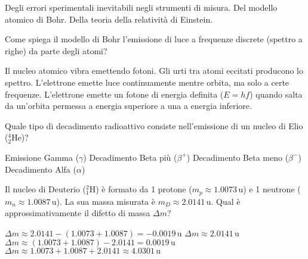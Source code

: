 \documentclass{exam}%
\begin{document}
\begin{questions}
\begin{choices}
\choice Degli errori sperimentali inevitabili negli strumenti di misura.%
\choice Del modello atomico di Bohr.%
\choice Della teoria della relatività di Einstein.%
\end{choices}%
\question Come spiega il modello di Bohr l'emissione di luce a frequenze discrete (spettro a righe) da parte degli atomi?%
\vspace{0.2em}%
\begin{choices}%
\choice Il nucleo atomico vibra emettendo fotoni.%
\choice Gli urti tra atomi eccitati producono lo spettro.%
\choice L'elettrone emette luce continuamente mentre orbita, ma solo a certe frequenze.%
\choice L'elettrone emette un fotone di energia definita ($E = hf$) quando salta da un'orbita permessa a energia superiore a una a energia inferiore.%
\end{choices}%
\question Quale tipo di decadimento radioattivo consiste nell'emissione di un nucleo di Elio ($^4_2\text{He}$)?%
\vspace{0.2em}%
\begin{multicols}{2}%
\begin{choices}%
\choice Emissione Gamma ($\gamma$)%
\choice Decadimento Beta più ($\beta^+$)%
\choice Decadimento Beta meno ($\beta^-$)%
\choice Decadimento Alfa ($\alpha$)%
\end{choices}%
\end{multicols}%
\question Il nucleo di Deuterio ($^2_1\text{H}$) è formato da 1 protone ($m_p \approx 1.0073 \, \text{u}$) e 1 neutrone ($m_n \approx 1.0087 \, \text{u}$). La sua massa misurata è $m_D \approx 2.0141 \, \text{u}$. Qual è approssimativamente il difetto di massa $\Delta m$?%
\vspace{0.2em}%
\begin{multicols}{2}%
\begin{choices}%
\choice $\Delta m \approx 2.0141 - (1.0073 + 1.0087) = -0.0019 \, \text{u}$%
\choice $\Delta m \approx 2.0141 \, \text{u}$%
\choice $\Delta m \approx (1.0073 + 1.0087) - 2.0141 = 0.0019 \, \text{u}$%
\choice $\Delta m \approx 1.0073 + 1.0087 + 2.0141 \approx 4.0301 \, \text{u}$%
\end{choices}%
\end{multicols}%
\end{questions}%
\end{document}
